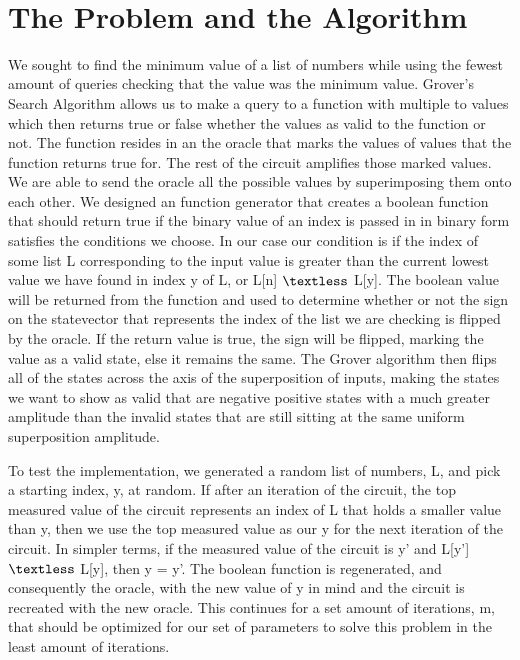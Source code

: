 \documentclass[11pt]{article}
\newcommand{\lecturenumber}{1-3}
\newcommand{\lecturedate}{8/24 - 8/28}
\begin{document}
\begin{center}
\ \\
\end{center}

\section{The Problem and the Algorithm}

We sought to find the minimum value of a list of numbers while using the fewest amount of queries checking that the value was the minimum value. Grover's Search Algorithm allows us to make a query to a function with multiple to values which then returns true or false whether the values as valid to the function or not. The function resides in an the oracle that marks the values of values that the function returns true for. The rest of the circuit amplifies those marked values. We are able to send the oracle all the possible values by superimposing them onto each other. We designed an function generator that creates a boolean function that should return true if the binary value of an index is passed in in binary form satisfies the conditions we choose. In our case our condition is if the index of some list L corresponding to the input value is greater than the current lowest value we have found in index y of L, or L[n] $\textless$  L[y]. The boolean value will be returned from the function and used to determine whether or not the sign on the statevector that represents the index of the list we are checking is flipped by the oracle. If the return value is true, the sign will be flipped, marking the value as a valid state, else it remains the same. The Grover algorithm then flips all of the states across the axis of the superposition of inputs, making the states we want to show as valid that are negative positive states with a much greater amplitude than the invalid states that are still sitting at the same uniform superposition amplitude.

To test the implementation, we generated a random list of numbers, L, and pick a starting index, y, at random. If after an iteration of the circuit, the top measured value of the circuit represents an index of L that holds a smaller value than y, then we use the top measured value as our y for the next iteration of the circuit. In simpler terms, if the measured value of the circuit is y' and L[y'] $\textless$ L[y], then y = y'. The boolean function is regenerated, and consequently the oracle, with the new value of y in mind and the circuit is recreated with the new oracle. This continues for a set amount of iterations, m, that should be optimized for our set of parameters to solve this problem in the least amount of iterations.
\end{document}
